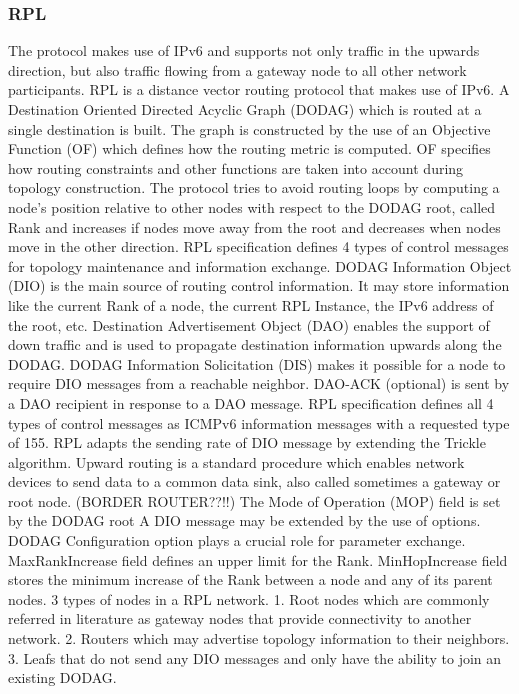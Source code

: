 \subsubsection*{RPL}
The protocol makes use of IPv6 and supports not only traffic in the upwards direction, but also traffic flowing from a gateway node to all other network participants.
	RPL is a distance vector routing protocol that makes use of IPv6. A Destination Oriented Directed Acyclic Graph (DODAG) which is routed at a single destination is built. 
	The graph is constructed by the use of an Objective Function (OF) which defines how the routing metric is computed. OF specifies how routing constraints and other functions are taken into account during topology construction. The protocol tries to avoid routing loops by computing a node’s position relative to other nodes with respect to the DODAG root, called Rank and increases if nodes move away from the root and decreases when nodes move in the other direction. 
	RPL specification defines 4 types of control messages for topology maintenance and information exchange. DODAG Information Object (DIO) is the main source of routing control information. It may store information like the current Rank of a node, the current RPL Instance, the IPv6 address of the root, etc. Destination Advertisement Object (DAO) enables the support of down traffic and is used to propagate destination information upwards along the DODAG. DODAG Information Solicitation (DIS) makes it possible for a node to require DIO messages from a reachable neighbor. DAO-ACK (optional) is sent by a DAO recipient in response to a DAO message. RPL specification defines all 4 types of control messages as ICMPv6 information messages with a requested type of 155.
	RPL adapts the sending rate of DIO message by extending the Trickle algorithm.
	Upward routing is a standard procedure which enables network devices to send data to a common data sink, also called sometimes a gateway or root node. (BORDER ROUTER??!!)
	The Mode of Operation (MOP) field is set by the DODAG root 
	A DIO message may be extended by the use of options. DODAG Configuration option plays a crucial role for parameter exchange. MaxRankIncrease field defines an upper limit for the Rank. MinHopIncrease field stores the minimum increase of the Rank between a node and any of its parent nodes.
	3 types of nodes in a RPL network. 1. Root nodes which are commonly referred in literature as gateway nodes that provide connectivity to another network. 2. Routers which may advertise topology information to their neighbors. 3. Leafs that do not send any DIO messages and only have the ability to join an existing DODAG. 
